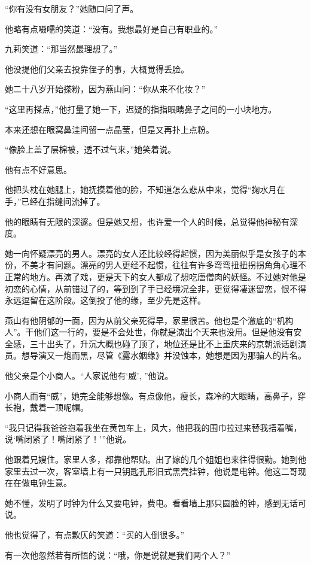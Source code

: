 \par “你有没有女朋友？”她随口问了声。
\par 他略有点嗫嚅的笑道：“没有。我想最好是自己有职业的。”
\par 九莉笑道：“那当然最理想了。”
\par 他没提他们父亲去投靠侄子的事，大概觉得丢脸。
\par 她二十八岁开始搽粉，因为燕山问：“你从来不化妆？”
\par “这里再搽点，”他打量了她一下，迟疑的指指眼睛鼻子之间的一小块地方。
\par 本来还想在眼窝鼻洼间留一点晶莹，但是又再扑上点粉。
\par “像脸上盖了层棉被，透不过气来，”她笑着说。
\par 他有点不好意思。
\par 他把头枕在她腿上，她抚摸着他的脸，不知道怎么悲从中来，觉得“掬水月在手，”已经在指缝间流掉了。
\par 他的眼睛有无限的深邃。但是她又想，也许爱一个人的时候，总觉得他神秘有深度。
\par 她一向怀疑漂亮的男人。漂亮的女人还比较经得起惯，因为美丽似乎是女孩子的本份，不美才有问题。漂亮的男人更经不起惯，往往有许多弯弯扭扭拐拐角角心理不正常的地方。再演了戏，更是天下的女人都成了想吃唐僧肉的妖怪。不过她对他是初恋的心情，从前错过了的，等到到了手已经境况全非，更觉得凄迷留恋，恨不得永远逗留在这阶段。这倒投了他的缘，至少先是这样。
\par 燕山有他阴郁的一面，因为从前父亲死得早，家里很苦。他也是个澈底的“机构人”。干他们这一行的，要是不会处世，你就是演出个天来也没用。但是他没有安全感，三十出头了，升沉大概也碰了顶了，地位还是比不上重庆来的京朝派话剧演员。想导演又一炮而黑，尽管《露水姻缘》并没蚀本，她想是因为那骗人的片名。
\par 他父亲是个小商人。“人家说他有‘威’, ”他说。
\par 小商人而有“威”，她完全能够想像。有点像他，瘦长，森冷的大眼睛，高鼻子，穿长袍，戴着一顶呢帽。
\par “我只记得我爸爸抱着我坐在黄包车上，风大，他把我的围巾拉过来替我捂着嘴，说‘嘴闭紧了！嘴闭紧了！'”他说。
\par 他跟着兄嫂住。家里人多，都靠他帮贴。出了嫁的几个姐姐也来往得很勤。她到他家里去过一次，客室墙上有一只钥匙孔形旧式黑壳挂钟，他说是电钟。他这二哥现在在做电钟生意。
\par 她不懂，发明了时钟为什么又要电钟，费电。看看墙上那只圆脸的钟，感到无话可说。
\par 他也觉得了，有点歉仄的笑道：“买的人倒很多。”
\par 有一次他忽然若有所悟的说：“哦，你是说就是我们两个人？”
